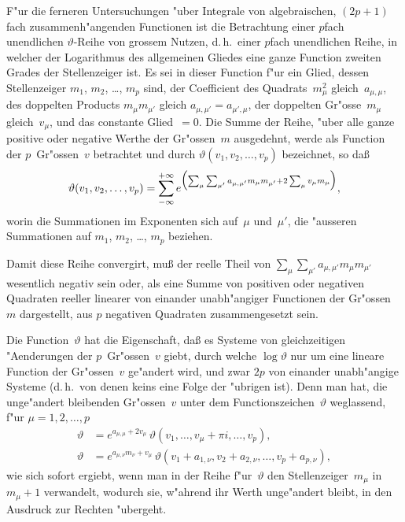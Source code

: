 \documentclass[12pt,a4paper]{book}
\theoremstyle{definition}
\theoremstyle{remark}
\begin{document}
F"ur die ferneren Untersuchungen "uber Integrale von algebraischen,
$(2p+1)$fach zusammenh"angenden Functionen ist die Betrachtung einer
$p$fach unendlichen $\vartheta$-Reihe von grossem Nutzen, d.\,h.\ einer $p$fach
unendlichen Reihe, in welcher der Logarithmus des allgemeinen Gliedes
eine ganze Function zweiten Grades der Stellenzeiger ist. Es sei in
dieser Function f"ur ein Glied, dessen Stellenzeiger $m_1$, $m_2$, \ldots, $m_p$
sind, der Coefficient des Quadrats~$m_\mu^2$ gleich~$a_{\mu,\mu}$, des doppelten
Products $m_\mu m_{\mu'}$ gleich $a_{\mu,\mu'} = a_{\mu',\mu}$, der doppelten Gr"osse~$m_\mu$
gleich~$v_\mu$, und das constante Glied~$= 0$. Die Summe der Reihe, "uber
alle ganze positive oder negative Werthe der Gr"ossen~$m$ ausgedehnt,
werde als Function der $p$~Gr"ossen~$v$ betrachtet und durch
$\vartheta(v_1, v_2, \ldots, v_p)$ bezeichnet, so da\ss{}
\begin{equation}
\label{eq:theta}
\vartheta(v_1, v_2, \ldots, v_p) =
\sum_{-\infty}^{+\infty} e^{\Bigl(\sum_\mu \sum_{\mu'}
  a_{\mu,\mu'} m_\mu m_{\mu'} + 2\sum_\mu v_\mu m_\mu\Bigr)},
\end{equation}
worin die Summationen im Exponenten sich auf~$\mu$ und~$\mu'$, die "ausseren
Summationen auf $m_1$, $m_2$, \ldots, $m_p$ beziehen.

Damit diese Reihe convergirt, mu\ss{} der reelle Theil von
$\sum_\mu \sum_{\mu'} a_{\mu,\mu'} m_\mu m_{\mu'}$ wesentlich negativ sein oder, als eine
Summe von positiven oder negativen Quadraten reeller linearer von einander
unabh"angiger Functionen der Gr"ossen~$m$ dargestellt, aus $p$ negativen
Quadraten zusammengesetzt sein.

Die Function~$\vartheta$ hat die Eigenschaft, da\ss{} es Systeme von
gleichzeitigen "Aenderungen der $p$~Gr"ossen~$v$ giebt, durch welche
$\log\vartheta$ nur um eine lineare Function der Gr"ossen~$v$ ge"andert wird,
und zwar $2p$ von einander unabh"angige Systeme (d.\,h.\ von denen
keins eine Folge der "ubrigen ist). Denn man hat, die unge"andert
bleibenden Gr"ossen~$v$ unter dem Functionszeichen~$\vartheta$ weglassend,
f"ur $\mu = 1, 2, \ldots, p$
\begin{align}
\vartheta &= e^{a_{\mu,\mu} + 2v_\mu}\,
  \vartheta(v_1, \ldots, v_\mu + \pi i, \ldots, v_p),
  \label{eq:theta2}\\
\vartheta &= e^{a_{\mu,\nu}m_\nu + v_\mu}\,
  \vartheta(v_1 + a_{1,\nu}, v_2 + a_{2,\nu}, \ldots, v_p + a_{p,\nu}),
  \label{eq:theta3}
\end{align}
wie sich sofort ergiebt, wenn man in der Reihe f"ur~$\vartheta$ den
Stellenzeiger~$m_\mu$ in $m_\mu + 1$ verwandelt, wodurch sie, w"ahrend ihr
Werth unge"andert bleibt, in den Ausdruck zur Rechten "ubergeht.
\end{document}
